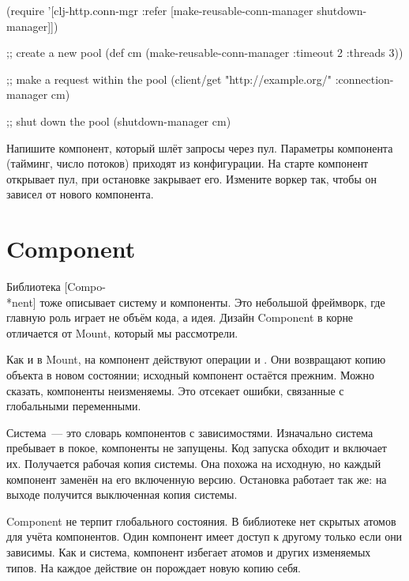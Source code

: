 \else

\begin{clojure}
(require
 '[clj-http.conn-mgr :refer
   [make-reusable-conn-manager
    shutdown-manager]])

;; create a new pool
(def cm (make-reusable-conn-manager
         {:timeout 2 :threads 3}))

;; make a request within the pool
(client/get "http://example.org/"
            {:connection-manager cm})

;; shut down the pool
(shutdown-manager cm)
\end{clojure}

\fi


Напишите компонент, который шлёт запросы через пул. Параметры компонента
(тайминг, число потоков) приходят из конфигурации. На старте компонент открывает
пул, при остановке закрывает его. Измените воркер так, чтобы он зависел от
нового компонента.

\ifafive\vspace{10mm}\pagebreak[4]\fi

\section{Component}


Библиотека [Compo-\\*nent] тоже
описывает систему и компоненты. Это небольшой фреймворк, где главную роль играет
не объём кода, а идея. Дизайн Component в корне отличается от Mount, который мы
рассмотрели.


Как и в Mount, на компонент действуют операции  и . Они
возвращают копию объекта в новом состоянии; исходный компонент остаётся
прежним. Можно сказать, компоненты неизменяемы. Это отсекает ошибки, связанные с
глобальными переменными.

Система~--- это словарь компонентов с зависимостями. Изначально система
пребывает в покое, компоненты не запущены. Код запуска обходит и включает
их. Получается рабочая копия системы. Она похожа на исходную, но каждый
компонент заменён на его включенную версию. Остановка работает так же: на выходе
получится выключенная копия системы.

Component не терпит глобального состояния. В библиотеке нет скрытых атомов для
учёта компонентов. Один компонент имеет доступ к другому только если они
зависимы. Как и система, компонент избегает атомов и других изменяемых типов. На
каждое действие он порождает новую копию себя.

